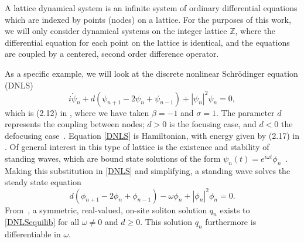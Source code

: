 \documentclass[12pt]{elsarticle}
\def\Z{{\mathbb Z}}
\begin{document}
A lattice dynamical system is an infinite system of ordinary differential equations which are indexed by points (nodes) on a lattice. For the purposes of this work, we will only consider dynamical systems on the integer lattice $\Z$, where the differential equation for each point on the lattice is identical, and the equations are coupled by a centered, second order difference operator.

As a specific example, we will look at the discrete nonlinear Schr{\"o}dinger equation (DNLS)
\begin{equation}\label{DNLS}
i\dot{\psi}_n + d(\psi_{n+1} - 2 \psi_n + \psi_{n-1}) + |\psi_n|^2 \psi_n = 0,
\end{equation}
which is (2.12) in \cite{Kevrekidis2009}, where we have taken $\beta = -1$ and $\sigma = 1$. The parameter $d$ represents the coupling between nodes; $d > 0$ is the focusing case, and $d < 0$ the defocusing case~\cite{Kevrekidis2009}. Equation \cref{DNLS} is Hamiltonian, with energy given by (2.17) in \cite{Kevrekidis2009,pelinovsky_2011}. Of general interest in this type of lattice is the existence and stability of standing waves, which are bound state solutions of the form $\psi_n(t) = e^{i \omega t}\phi_n$~\cite{alfimov}. Making this substitution in \cref{DNLS} and simplifying, a standing wave solves the steady state equation
\begin{equation}\label{DNLSequilib}
d(\phi_{n+1} - 2 \phi_n + \phi_{n-1}) - \omega \phi_n + |\phi_n|^2 \phi_n = 0.
\end{equation}
From~\cite{herrmann_2011}, a symmetric, real-valued, on-site soliton solution $q_n$ exists to \cref{DNLSequilib} for all $\omega \neq 0$ and $d \geq 0$. This solution $q_n$ furthermore is differentiable in $\omega$. 
\end{document}
